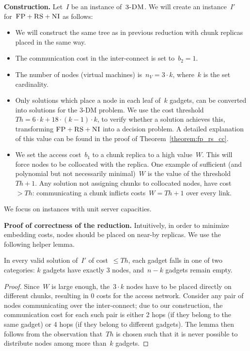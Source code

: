 \documentclass[preprint,12pt]{elsarticle}
\newcommand{\maciek}[1]{\textcolor{brown}{maciek: #1}}
\newcommand{\CC}{\textsc{NI}}
\newcommand{\FP}{\textsc{FP}}
\newcommand{\RS}{\textsc{RS}}
\newcommand{\CostTrans}{\ensuremath{b_1}}
\newcommand{\CostCom}{\ensuremath{b_2}}
\newcommand{\Vms}{\ensuremath{n_V}}
\newcommand{\TDM}{\textsc{3-DM}}
\newcommand{\Thr}{\ensuremath{Th}}
\begin{document}
\textbf{Construction.}
Let~$I$ be an instance of~$\TDM$. We will create an instance~$I'$
for~$\FP+\RS+\CC$ as follows:
\begin{itemize}
\item We will construct the same tree as in previous reduction with
chunk replicas placed in the same way.
\item The communication cost in the inter-connect is set to~$\CostCom = 1$.
\item The number of nodes (virtual machines) is~$\Vms = 3 \cdot k$, where~$k$ is the set cardinality.
\item Only solutions which place a node in each leaf of~$k$ gadgets, can
be converted into solutions for the 3-DM problem. We use the cost threshold
$\Thr =  6 \cdot k + 18 \cdot
(k - 1) \cdot k$, to verify whether a solution achieves this, transforming
$\FP+\RS+\CC$ into a decision problem. A detailed explanation of this value can
be found in the proof of Theorem~\ref{theorem:fp_rs_cc}.
\item We set the access cost~$\CostTrans$ to a chunk replica to a high value~$W$. This will force
nodes to be collocated with the replica. One example of sufficient
(and polynomial but not necessarily minimal)~$W$
is the value of the threshold~$\Thr+1$. Any solution not
assigning chunks to collocated nodes, have cost~$> \Thr$:
communicating a chunk inflicts costs~$W=\Thr+1$ over every link.
\end{itemize}

We focus on instances with unit server capacities.

\textbf{Proof of correctness of the reduction.}
Intuitively, in order to minimize embedding costs,
nodes should be placed on near-by replicas. We use the following
helper lemma.
\begin{lemma}\label{lemma:helper}
In every valid solution of~$I'$ of cost~$\leq \Thr$, each gadget
falls in one of two categories:
$k$ gadgets have exactly
$3$ nodes, and~$n-k$ gadgets remain empty.
\end{lemma}
\begin{proof}
Since~$W$ is large enough, the~$3\cdot k$ nodes have to be placed
directly on different chunks, resulting in 0 costs for the access network.
Consider any pair of nodes
communicating over the
inter-connect; due to our construction, the communication cost
for each such pair is either
2 hops (if they belong to the same gadget) or 4 hops (if they belong
to different gadgets).
The lemma then follows from the observation that~$\Thr$
is chosen such that it is never possible to distribute nodes
among more than~$k$ gadgets.
\end{proof}
\end{document}

